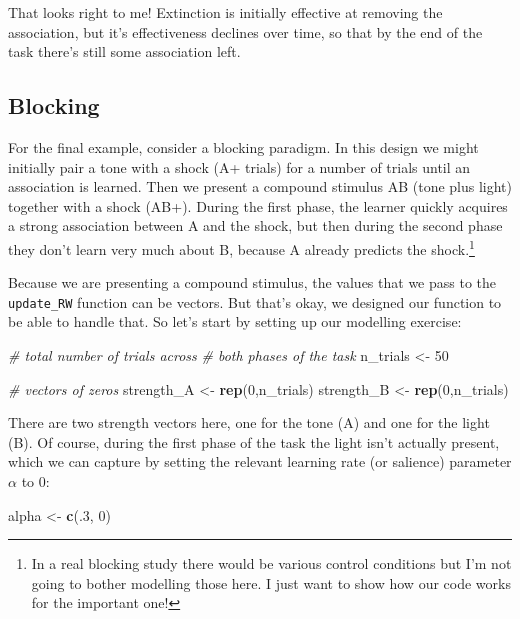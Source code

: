 \documentclass[]{book}
\newenvironment{Shaded}{\begin{snugshade}}{\end{snugshade}}
\newcommand{\CommentTok}[1]{\textcolor[rgb]{0.56,0.35,0.01}{\textit{#1}}}
\newcommand{\DecValTok}[1]{\textcolor[rgb]{0.00,0.00,0.81}{#1}}
\newcommand{\KeywordTok}[1]{\textcolor[rgb]{0.13,0.29,0.53}{\textbf{#1}}}
\newcommand{\NormalTok}[1]{#1}
\newcommand{\StringTok}[1]{\textcolor[rgb]{0.31,0.60,0.02}{#1}}
\let\rmarkdownfootnote\footnote%
\def\footnote{\protect\rmarkdownfootnote}
\begin{document}
That looks right to me! Extinction is initially effective at removing the association, but it's effectiveness declines over time, so that by the end of the task there's still some association left.

\hypertarget{blocking}{%
\subsection{Blocking}\label{blocking}}

For the final example, consider a blocking paradigm. In this design we might initially pair a tone with a shock (A+ trials) for a number of trials until an association is learned. Then we present a compound stimulus AB (tone plus light) together with a shock (AB+). During the first phase, the learner quickly acquires a strong association between A and the shock, but then during the second phase they don't learn very much about B, because A already predicts the shock.\footnote{In a real blocking study there would be various control conditions but I'm not going to bother modelling those here. I just want to show how our code works for the important one!}

Because we are presenting a compound stimulus, the values that we pass to the \texttt{update\_RW} function can be vectors. But that's okay, we designed our function to be able to handle that. So let's start by setting up our modelling exercise:

\begin{Shaded}
\begin{Highlighting}[]
\CommentTok{# total number of trials across }
\CommentTok{# both phases of the task}
\NormalTok{n_trials <-}\StringTok{ }\DecValTok{50}

\CommentTok{# vectors of zeros}
\NormalTok{strength_A <-}\StringTok{ }\KeywordTok{rep}\NormalTok{(}\DecValTok{0}\NormalTok{,n_trials)}
\NormalTok{strength_B <-}\StringTok{ }\KeywordTok{rep}\NormalTok{(}\DecValTok{0}\NormalTok{,n_trials)}
\end{Highlighting}
\end{Shaded}

There are two strength vectors here, one for the tone (A) and one for the light (B). Of course, during the first phase of the task the light isn't actually present, which we can capture by setting the relevant learning rate (or salience) parameter \(\alpha\) to 0:

\begin{Shaded}
\begin{Highlighting}[]
\NormalTok{alpha <-}\StringTok{ }\KeywordTok{c}\NormalTok{(.}\DecValTok{3}\NormalTok{, }\DecValTok{0}\NormalTok{)}
\end{Highlighting}
\end{Shaded}
\end{document}
